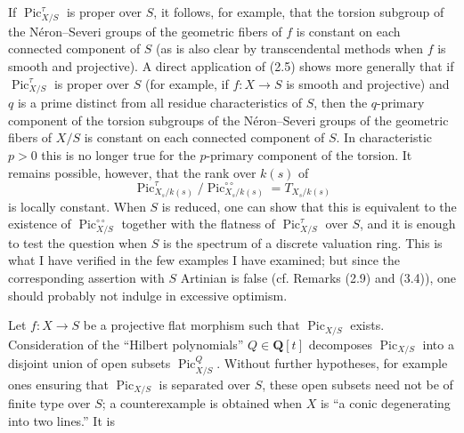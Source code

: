  If $\operatorname{Pic}_{X/S}^\tau$ is proper over $S$,
it follows, for example, that the torsion subgroup of the Néron--Severi groups
of the geometric fibers of $f$ is constant on each connected component of $S$
(as is also clear by transcendental methods when $f$ is smooth and projective).
A direct application of (2.5) shows more generally that if $\operatorname{Pic}_{X/S}^\tau$ is proper over $S$ (for example, if $f:X\longrightarrow S$ is smooth and projective) and $q$ is a prime distinct
from all residue characteristics of $S$, then the $q$-primary component of the
torsion subgroups of the Néron--Severi groups of the geometric fibers of $X/S$
is constant on each connected component of $S$. In characteristic $p>0$ this
is no longer true for the $p$-primary component of the torsion. It remains
possible, however, that the rank over $k(s)$ of
\[
\operatorname{Pic}_{X_s/k(s)}^\tau/
\operatorname{Pic}_{X_s/k(s)}^{\circ\circ}=T_{X_s/k(s)}
\]
is locally constant. When $S$ is reduced, one can show that this is equivalent
to the existence of $\operatorname{Pic}_{X/S}^{\circ\circ}$ together with
the flatness of $\operatorname{Pic}_{X/S}^\tau$ over $S$, and it is enough to
test the question when $S$ is the spectrum of a discrete valuation ring. This
is what I have verified in the few examples I have examined; but since the
corresponding assertion with $S$ Artinian is false (cf. Remarks (2.9) and
(3.4)), one should probably not indulge in excessive optimism.


Let $f:X\longrightarrow S$ be a projective flat morphism such that
$\operatorname{Pic}_{X/S}$ exists. Consideration of the “Hilbert polynomials”
$Q\in\mathbf Q[t]$ decomposes $\operatorname{Pic}_{X/S}$ into a disjoint union
of open subsets $\operatorname{Pic}_{X/S}^Q$. Without further hypotheses, for
example ones ensuring that $\operatorname{Pic}_{X/S}$ is separated over $S$,
these open subsets need not be of finite type over $S$; a counterexample is
obtained when $X$ is “a conic degenerating into two lines.” It is


